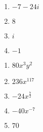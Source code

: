 \begin{multicols}{4}
\begin{enumerate}
\setcounter{enumi}{\value{HW}}

\item  $-7-24i$

\item  $8$

\item $i$

\item  $-1$

\setcounter{HW}{\value{enumi}}
\end{enumerate}
\end{multicols}


\begin{multicols}{5}

\begin{enumerate}
\setcounter{enumi}{\value{HW}}

\item  $80x^3y^2$

\item  $236x^{117}$

\item  $-24x^{\frac{7}{2}}$

\item  $-40 x^{-7}$

\item  $70$

\end{enumerate}

\end{multicols}

